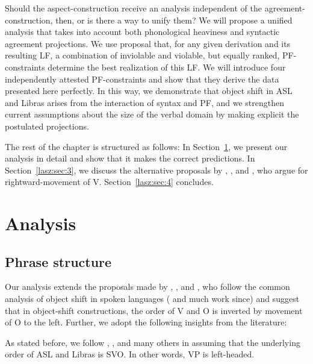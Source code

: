 \documentclass[output=paper]{langscibook}
\begin{document}
Should the aspect-construction receive an analysis independent
of the agree\-ment-con\-struc\-tion, then, or is there a way to unify them?
We will propose a unified analysis that takes into account both
phonological heaviness and syntactic agreement projections. We use
 proposal that, for any given
derivation and its resulting LF, a combination of inviolable and
violable, but equally ranked, PF-constraints determine the best
realization of this LF. We will introduce four independently attested
PF-constraints and show that they derive the data presented here
perfectly. In this way, we demonstrate that object shift in ASL and
Libras arises from the interaction of syntax and PF, and we strengthen
current assumptions about the size of the verbal domain by making
explicit the postulated projections.\largerpage

The rest of the chapter is structured as follows: In Section~\ref{lasz:sec:2}, we
present our analysis in detail and show that it makes the correct
predictions. In Section~\ref{lasz:sec:3}, we discuss the alternative proposals by
\citet{Fischer.Janis.1992}, \citet{Matsuoka.1997}, and \citet{Braze.2004}, who
argue for rightward-movement of V. Section~\ref{lasz:sec:4} concludes.

\section{Analysis}
\label{lasz:sec:2}
    
\subsection{Phrase structure}\label{lasz:sec:21}

Our analysis extends the proposals made by \citet{Quadros.etal.2004}, 
\citet{Quadros.DLM.2010}, and \citet{Gokgoz.2013}, who follow the
common analysis of object shift in spoken languages (\citealp{Holmberg:1986}
and much work since) and suggest that in object-shift constructions,
the order of V and O is inverted by movement of O to the left. Further,
we adopt the following insights from the literature:

As stated before, we follow \citet{Fischer.1975}, \citet{Liddell.1980},
\citet{Quadros.1999} and many others in assuming that the underlying order
of ASL and Libras is SVO. In other words, VP is left-headed.
\end{document}

